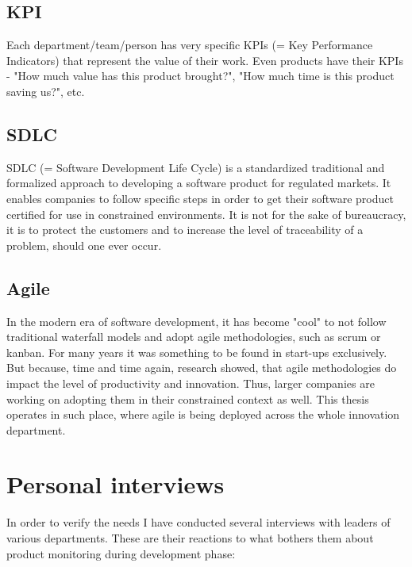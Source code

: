 \subsection{KPI}

Each department/team/person has very specific KPIs (= Key Performance Indicators) that represent the value of their work. Even products have their KPIs - "How much value has this product brought?", "How much time is this product saving us?", etc.

\subsection{SDLC}

SDLC (= Software Development Life Cycle) is a standardized traditional and formalized approach to developing a software product for regulated markets. It enables companies to follow specific steps in order to get their software product certified for use in constrained environments. It is not for the sake of bureaucracy, it is to protect the customers and to increase the level of traceability of a problem, should one ever occur.

\subsection{Agile}

In the modern era of software development, it has become "cool" to not follow traditional waterfall models and adopt agile methodologies, such as scrum or kanban. For many years it was something to be found in start-ups exclusively. But because, time and time again, research showed\cite{947100}, that agile methodologies do impact the level of productivity and innovation. Thus, larger companies are working on adopting them in their constrained context as well. This thesis operates in such place, where agile is being deployed across the whole innovation department.

\section{Personal interviews}

In order to verify the needs I have conducted several interviews with leaders of various departments. These are their reactions to what bothers them about product monitoring during development phase:

